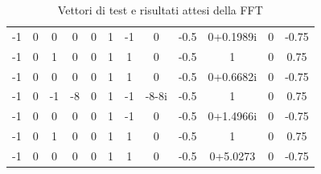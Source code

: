 \begin{table}[ht!]
\begin{tabular}{|cc|cc|cc|cc|cc|cc|}
            -1           &    0     &          0         &     0    &           0        &     1    &          -1        &     0    &         -0.5       &     0+0.1989i  &          0         &  -0.75   \\
            -1           &    0     &          1         &     0    &           0        &     1    &           1        &     0    &         -0.5       &     1          &          0         &   0.75   \\
            -1           &    0     &          0         &     0    &           0        &     1    &           1        &     0    &         -0.5       &     0+0.6682i  &          0         &  -0.75   \\
            -1           &    0     &          -1        &     -8   &           0        &     1    &          -1        &    -8-8i &         -0.5       &     1          &          0         &   0.75   \\
            -1           &    0     &          0         &     0    &           0        &     1    &          -1        &     0    &         -0.5       &     0+1.4966i  &          0         &  -0.75   \\
            -1           &    0     &          1         &     0    &           0        &     1    &           1        &     0    &         -0.5       &     1          &          0         &   0.75   \\
            -1           &    0     &          0         &     0    &           0        &     1    &           1        &     0    &         -0.5       &     0+5.0273   &          0         &  -0.75   \\ \hline
    \end{tabular}
    \caption{Vettori di test e risultati attesi della FFT}
    \label{tab: risultati_fft}
\end{table}